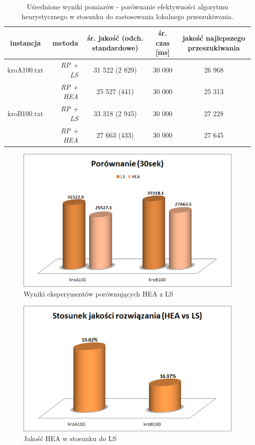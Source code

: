 \documentclass{article}
\begin{document}
\begin{table}[h!]
\begin{center}
\centering
  \begin{tabular}{| c | D | S | c | S | }
\hline
	instancja & metoda & śr. jakość (odch. standardowe) & śr. czas [ms] & jakość najlepszego przeszukiwania \\ \hline
    kroA100.txt & \emph{RP + LS} & 31 522 (2 829) & 30 000 & 26 968 \\
     & \emph{RP + HEA} & 25 527 (441) & 30 000 & 25 313 \\
\hline
    kroB100.txt & \emph{RP + LS} & 33 318 (2 945) & 30 000 & 27 228 \\
     & \emph{RP + HEA} & 27 663 (433) & 30 000 & 27 645 \\
\hline
  \end{tabular}
\end{center}
\caption{Uśrednione wyniki pomiarów - porównanie efektywności algorytmu heurystycznego w stosunku do zastosowania lokalnego przeszukiwania.} \label{tab:wynikils}
\end{table}
\begin{figure}[h!]
\centering\includegraphics[width=17cm]{img/wyk4.png}
\caption{Wyniki eksperymentów porównujących HEA z LS}
\label{wyk:wyniki_por}
\end{figure}
\begin{figure}[h!]
\centering\includegraphics[width=17cm]{img/wyk5.png}
\caption{Jakość HEA w stosunku do LS}
\label{wyk:wyniki_por_2}
\end{figure}
\end{document}
